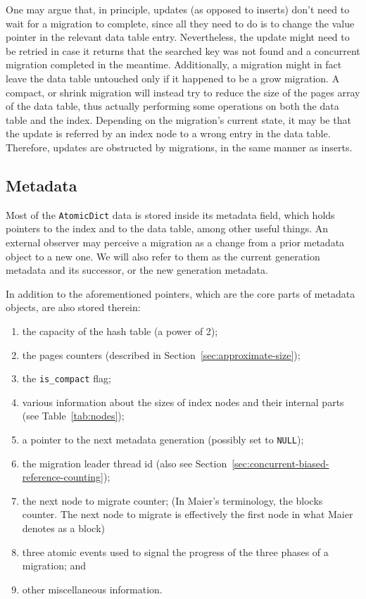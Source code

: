 One may argue that, in principle, updates (as opposed to inserts) don't need to wait for a migration to complete, since all they need to do is to change the value pointer in the relevant data table entry.
Nevertheless, the update might need to be retried in case it returns that the searched key was not found and a concurrent migration completed in the meantime.
Additionally, a migration might in fact leave the data table untouched only if it happened to be a grow migration.
A compact, or shrink migration will instead try to reduce the size of the pages array of the data table, thus actually performing some operations on both the data table and the index.
Depending on the migration's current state, it may be that the update is referred by an index node to a wrong entry in the data table.
Therefore, updates are obstructed by migrations, in the same manner as inserts.

\subsection{Metadata}\label{subsec:metadata}
Most of the \texttt{AtomicDict} data is stored inside its metadata field, which holds pointers to the index and to the data table, among other useful things.
An external observer may perceive a migration as a change from a prior metadata object to a new one.
We will also refer to them as the current generation metadata and its successor, or the new generation metadata.

In addition to the aforementioned pointers, which are the core parts of metadata objects, are also stored therein:
\begin{enumerate}
    \item the capacity of the hash table (a power of 2);
    \item the pages counters (described in Section~\ref{sec:approximate-size});
    \item the \texttt{is\_compact} flag;
    \item various information about the sizes of index nodes and their internal parts (see Table~\ref{tab:nodes});
    \item a pointer to the next metadata generation (possibly set to \texttt{NULL});
    \item the migration leader thread id (also see Section~\ref{sec:concurrent-biased-reference-counting});
    \item the next node to migrate counter; (In Maier's terminology, the blocks counter.
    The next node to migrate is effectively the first node in what Maier denotes as a block)
    \item three atomic events used to signal the progress of the three phases of a migration; and
    \item other miscellaneous information.
\end{enumerate}

